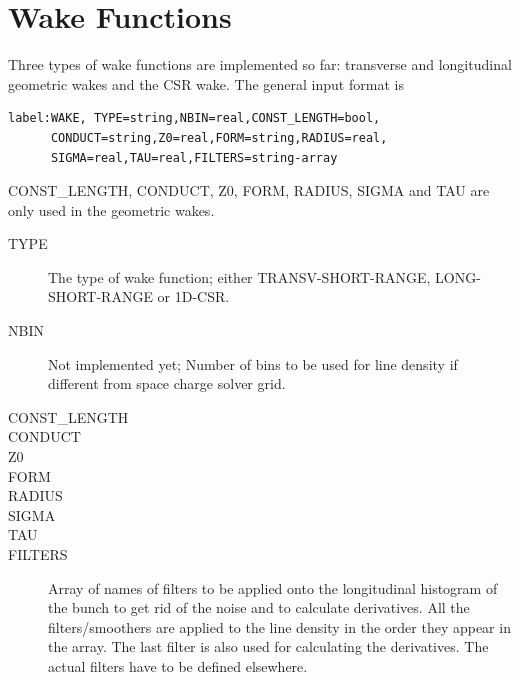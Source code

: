 \section{Wake Functions}
Three types of wake functions are implemented so far: transverse and longitudinal geometric wakes and the CSR wake. The general input format is
\begin{verbatim}
label:WAKE, TYPE=string,NBIN=real,CONST_LENGTH=bool,
      CONDUCT=string,Z0=real,FORM=string,RADIUS=real,
      SIGMA=real,TAU=real,FILTERS=string-array
\end{verbatim}
CONST\_LENGTH, CONDUCT, Z0, FORM, RADIUS, SIGMA and TAU are only used in the geometric wakes.
\begin{description}
\item[TYPE]
  The type of wake function; either TRANSV-SHORT-RANGE, LONG-SHORT-RANGE or 1D-CSR.
\item[NBIN]
  Not implemented yet; Number of bins to be used for line density if different from space charge solver grid.
\item[CONST\_LENGTH]
  
\item[CONDUCT]

\item[Z0]

\item[FORM]

\item[RADIUS]

\item[SIGMA]

\item[TAU]

\item[FILTERS]
  Array of names of filters to be applied onto the longitudinal histogram of the bunch to get rid of the noise and to calculate derivatives. All the filters/smoothers are applied to the line density in the order they appear in the array. The last filter is also used for calculating the derivatives. The actual filters have to be defined elsewhere.
\end{description}

